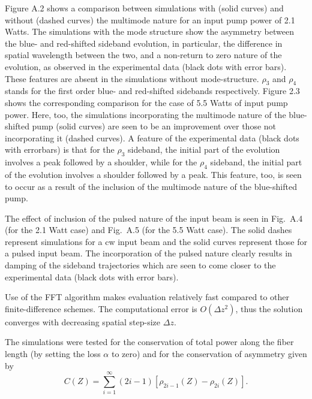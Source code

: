 Figure A.2 shows a comparison between simulations with (solid curves) and without (dashed curves) the multimode nature for an input pump power of 2.1 Watts. The simulations with the mode structure show the asymmetry between the blue- and red-shifted sideband evolution, in particular, the difference in spatial wavelength between the two, and a non-return to zero nature of the evolution, as observed in the experimental data (black dots with error bars). These features are absent in the simulations without mode-structure. $\rho_3$ and $\rho_4$ stands for the first order blue- and red-shifted sidebands respectively.  Figure 2.3 shows the corresponding comparison for the case of 5.5 Watts of input pump power.  Here, too, the simulations incorporating the multimode nature of the blue-shifted pump (solid curves) are seen to be an improvement over those not incorporating it (dashed curves). A feature of the experimental data (black dots with errorbars) is that for the $\rho_3$ sideband, the initial part of the evolution involves a peak followed by a shoulder, while for the $\rho_4$ sideband, the initial part of the evolution involves a shoulder followed by a peak. This feature, too, is seen to occur as a result of the inclusion of the multimode nature of the blue-shifted pump.

The effect of inclusion of the pulsed nature of the input beam is seen in Fig.\ A.4 (for the 2.1 Watt case) and Fig.\ A.5 (for the 5.5 Watt case). The solid dashes represent simulations for a cw input beam and the solid curves represent those for a pulsed input beam. The incorporation of the pulsed nature clearly results in damping of the sideband trajectories which are seen to come closer to the experimental data \cite{hart1} (black dots with error bars).

Use of the FFT algorithm makes evaluation relatively fast compared to other
finite-difference schemes. The computational error is $O(\Delta z^2)$, thus
the solution converges with decreasing spatial step-size $\Delta z$.

The simulations were tested for the conservation of total power along the
fiber length (by setting the loss $\alpha$ to zero) and for the conservation
of asymmetry \cite{thompson1,hart1} given by
\begin{equation}
C(Z) = \sum_{i=1}^{\infty}(2i-1)[\rho_{2i-1}(Z)-\rho_{2i}(Z)] .
\end{equation}

